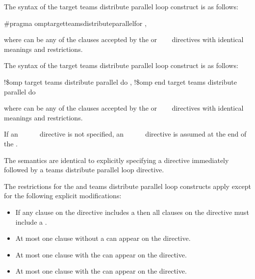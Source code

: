 \syntax
\ccppspecificstart
The syntax of the target teams distribute parallel loop construct is as follows:

\begin{boxedcode}
\#pragma omp\plc{ }target\plc{ }teams\plc{ }distribute\plc{ }parallel\plc{ }for \plc{[clause[ [},\plc{] clause] ... ]}
\end{boxedcode}

where  can be any of the clauses accepted by the  or
~~~ directives with identical 
meanings and restrictions.
\ccppspecificend

\begin{samepage}
\fortranspecificstart
The syntax of the target teams distribute parallel loop construct is as follows:

\begin{boxedcode}
!\$omp target teams distribute parallel do \plc{[clause[ [},\plc{] clause] ... ]}
\plc{[}!\$omp end target teams distribute parallel do\plc{]}
\end{boxedcode}
\end{samepage}

where  can be any of the clauses accepted by the  or 
~~~ directives with 
identical meanings and restrictions.

If an ~~~~~ directive is not specified, an 
~~~~~ 
directive is assumed at the end of the .
\fortranspecificend

\descr
The semantics are identical to explicitly specifying a  
directive immediately followed by a teams distribute parallel loop directive.


\restrictions
The restrictions for the  and teams distribute parallel 
loop constructs apply except for the following explicit modifications:

\begin{itemize}
\item If any  clause on the directive includes a
       then all  clauses 
      on the directive must include a .

\item At most one  clause without a 
       can appear on the directive.

\item At most one  clause with the  
       can appear on the directive.


\item At most one  clause with the  
       can appear on the directive.
\end{itemize}


